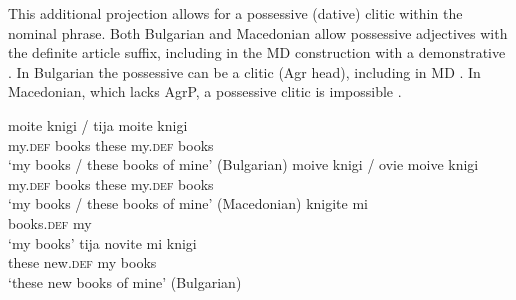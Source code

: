 \documentclass[output=paper,
colorlinks,
citecolor=brown,
newtxmath
]{langscibook}
\begin{document}
\noindent This additional projection allows for a possessive (dative) clitic within the nominal phrase. Both Bulgarian and Macedonian allow possessive adjectives with the definite article suffix, including in the MD construction with a demonstrative . In Bulgarian the possessive can be a clitic (Agr head), including in MD . In Macedonian, which lacks AgrP, a possessive clitic is impossible .

\ea \label{moite}
\ea
\gll moite knigi / tija moite knigi\\
    my.\textsc{def} books { } these my.\textsc{def} books\\
\glt`my books / these books of mine' \hfill (Bulgarian)
\ex
\gll moive knigi / ovie moive knigi\\
my.\textsc{def} books { } these my.\textsc{def} books\\
\glt`my books / these books of mine' \hfill (Macedonian)
\z \z
\ea \label{te mi}
\ea
\gll knigite mi\\
	books.\textsc{def} 	my\\
\glt`my books'
\ex
\gll tija 	novite 	mi 	knigi \\
these 	new.\textsc{def}	my 	books\\
\glt`these new books of mine’	\hfill (Bulgarian)
\z \z
\ea \label{ve mi}
\z \z
\end{document}
